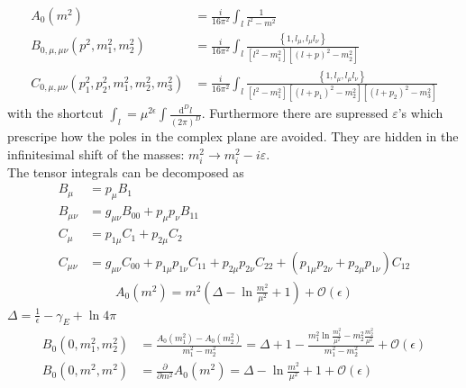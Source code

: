 \begin{align}
A_0(m^2) &= \frac{i}{16\pi^2} \int_l \frac{1}{l^2-m^2}\nonumber\\
B_{0,\mu,\mu\nu}(p^2,m_1^2,m_2^2) &= \frac{i}{16\pi^2} \int_l \frac{\left\{1,l_\mu,l_\mu l_\nu \right\}}{[l^2-m_1^2][(l+p)^2-m_2^2]}\nonumber\\
C_{0,\mu,\mu\nu}(p_1^2,p_2^2,m_1^2,m_2^2,m_3^2) &= \frac{i}{16\pi^2} \int_l \frac{\left\{1,l_\mu,l_\mu l_\nu \right\}}{[l^2-m_1^2][(l+p_1)^2-m_2^2][(l+p_2)^2-m_3^2]}
\end{align}
with the shortcut $\int_l = \mu^{2\epsilon}\int\frac{\mathrm{d}^D l}{(2\pi)^D}$. Furthermore there are supressed $\varepsilon$'s which prescripe how the poles in the complex plane are avoided. They are hidden in the infinitesimal shift of the masses: $m_i^2 \to m_i^2 - i \varepsilon$.\\
The tensor integrals can be decomposed as
\begin{align}
B_\mu &= p_\mu B_1\nonumber\\
B_{\mu\nu} &= g_{\mu\nu}B_{00} + p_\mu p_\nu B_{11}\nonumber\\
C_\mu &= p_{1\mu}C_1 + p_{2\mu}C_2 \nonumber\\
C_{\mu\nu} &= g_{\mu\nu}C_{00} + p_{1\mu}p_{1\nu}C_{11} + p_{2\mu}p_{2\nu}C_{22} + (p_{1\mu}p_{2\nu} + p_{2\mu}p_{1\nu})C_{12} 
\end{align}
\begin{align}
A_0(m^2) = m^2\left( \Delta -\ln \frac{m^2}{\mu^2} + 1 \right) + \mathcal{O}(\epsilon)
\end{align}
$\Delta = \frac{1}{\epsilon} - \gamma_E+\ln 4\pi$
\begin{align}
B_0(0,m_1^2,m_2^2) &= \frac{A_0(m_1^2)-A_0(m_2^2)}{m_1^2-m_2^2} = \Delta + 1 -\frac{m_1^2\ln \frac{m_1^2}{\mu^2}-m_2^2\frac{m_2^2}{\mu^2}}{m_1^2-m_2^2} + \mathcal{O}(\epsilon)\\
B_0(0,m^2,m^2) &= \frac{\partial}{\partial m^2} A_0(m^2) = \Delta -\ln \frac{m^2}{\mu^2} + 1 + \mathcal{O}(\epsilon)
\end{align}




